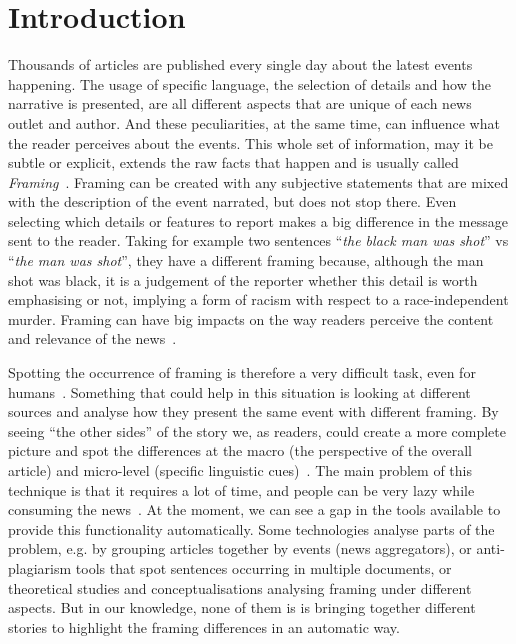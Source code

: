 \chapter{Introduction}


Thousands of articles are published every single day about the latest events happening.
The usage of specific language, the selection of details and how the narrative is presented, are all different aspects that are unique of each news outlet and author.
And these peculiarities, at the same time, can influence what the reader perceives about the events.
This whole set of information, may it be subtle or explicit, extends the raw facts that happen and is usually called \emph{Framing}~\cite{gamson1989media,scheufele1999framing}.
Framing can be created with any subjective statements that are mixed with the description of the event narrated, but does not stop there.
Even selecting which details or features to report makes a big difference in the message sent to the reader.
Taking for example two sentences ``\textit{the black man was shot}'' vs ``\textit{the man was shot}'', they have a different framing because, although the man shot was black, it is a judgement of the reporter whether this detail is worth emphasising or not, implying a form of racism with respect to a race-independent murder.
Framing can have big impacts on the way readers perceive the content and relevance of the news~\cite{cohen2015press}. %



Spotting the occurrence of framing is therefore a very difficult task, even for humans~\cite{morstatter2018identifying}. Something that could help in this situation is looking at different sources and analyse how they present the same event with different framing.
By seeing ``the other sides'' of the story we, as readers, could create a more complete picture and spot the differences at the macro (the perspective of the overall article) and micro-level (specific linguistic cues)~\cite{gamson1989media}.
The main problem of this technique is that it requires a lot of time,
and people can be very lazy while consuming the news~\cite{pennycook2019lazy}.
At the moment, we can see a gap in the tools available to provide this functionality automatically.
Some technologies analyse parts of the problem, e.g. by grouping articles together by events (news aggregators), or anti-plagiarism tools that spot sentences occurring in multiple documents, or theoretical studies and conceptualisations analysing framing under different aspects.
But in our knowledge, none of them is is bringing together different stories to highlight the framing differences in an automatic way.


